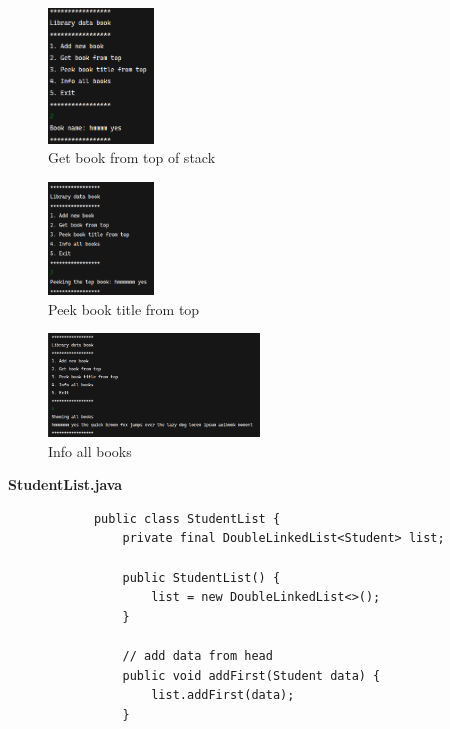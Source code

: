 \documentclass[12pt,titlepage]{article}
\begin{document}
\begin{enumerate}
{        \begin{figure}[h]
            \centering
            \includegraphics[width=0.25\textwidth]{./images/2-2.png}
            \caption{Get book from top of stack}
        \end{figure}

        \begin{figure}[h]
            \centering
            \includegraphics[width=0.25\textwidth]{./images/2-3.png}
            \caption{Peek book title from top}
        \end{figure}

        \pagebreak

        \begin{figure}[h]
            \centering
            \includegraphics[width=0.5\textwidth]{./images/2-4.png}
            \caption{Info all books}
        \end{figure}

        \large{\textbf{StudentList.java}}
        \begin{verbatim}
            public class StudentList {
                private final DoubleLinkedList<Student> list;

                public StudentList() {
                    list = new DoubleLinkedList<>();
                }

                // add data from head
                public void addFirst(Student data) {
                    list.addFirst(data);
                }


\end{verbatim}}
\end{enumerate}
\end{document}

